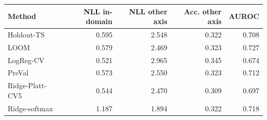 \begin{tabular}{lrrrr}
\toprule
Method & NLL in-domain & NLL other axis & Acc. other axis & AUROC \\
\midrule
Holdout-TS & 0.595 & 2.548 & 0.322 & 0.708 \\
LOOM & 0.579 & 2.469 & 0.323 & 0.727 \\
LogReg-CV & 0.521 & 2.965 & 0.345 & 0.674 \\
PreVal & 0.573 & 2.550 & 0.323 & 0.712 \\
Ridge-Platt-CV5 & 0.544 & 2.470 & 0.309 & 0.697 \\
Ridge-softmax & 1.187 & 1.894 & 0.322 & 0.718 \\
\bottomrule
\end{tabular}

